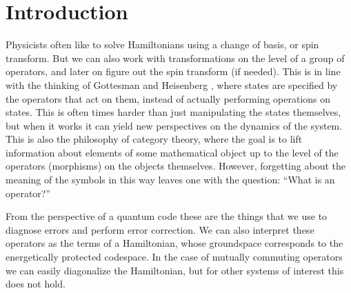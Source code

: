 \documentclass[12pt]{article}
\begin{document}
\newpage
\tableofcontents
\newpage


\def\Complex{\mathbb{C}}
\def\C{\mathbb{C}}
\def\R{\mathbb{R}}
\def\Z{\mathbb{Z}}
\def\Ham{H}
\def\Pauli{\mathcal{P}}
\def\Spec{\mbox{Spec}}
\def\Proveit{{\it (Proof??)}}
\def\GL{\mathrm{GL}}
\def\half{\frac{1}{2}}
\def\Stab{S}

\newcommand{\ket}[1]{|{#1}\rangle}
\newcommand{\expect}[1]{\langle{#1}\rangle}
\newcommand{\bra}[1]{\langle{#1}|}
\newcommand{\ketbra}[2]{\ket{#1}\!\bra{#2}}
\newcommand{\braket}[2]{\langle{#1}|{#2}\rangle}

\newcommand{\todo}[1]{\textcolor{red}{#1}}

\def\smbox#1{\ \ \mbox{#1}\ \ }



%
%

\section{Introduction}

Physicists often like to solve Hamiltonians 
using a change of basis, or spin transform.
But we can also work with transformations on the level of a
group of operators,
and later on figure out the spin transform (if needed).
This is in line with the thinking of 
Gottesman and Heisenberg \cite{Gottesman1998}, where states are
specified by the operators that act on them, instead of
actually performing operations on states.
This is often times harder than just manipulating the
states themselves, but when it works it can yield
new perspectives on the dynamics of the system.
This is also
the philosophy of category theory, where the goal is to lift
information about elements of some mathematical object
up to the level of the operators (morphisms) on the
objects themselves.
However, forgetting about the meaning of the symbols in this way 
leaves one with the question:
``What is an operator?''

From the perspective of a quantum code these are the
things that we use to diagnose errors and perform error correction.
We can also interpret these operators as the terms of a Hamiltonian, whose
groundspace corresponds to the energetically protected codespace.
In the case of mutually commuting operators we can easily diagonalize the
Hamiltonian, but for other systems of interest this does not hold.
\end{document}
